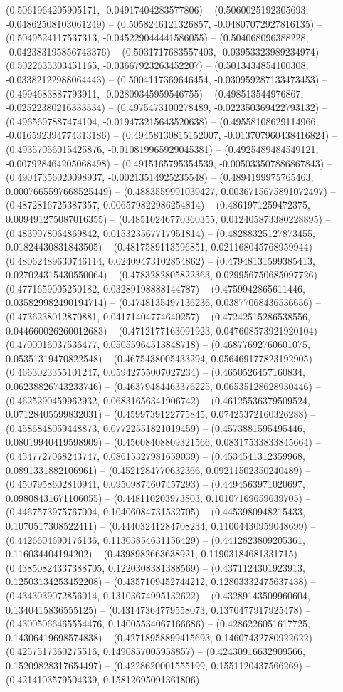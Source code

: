 (0.5061964205905171, -0.04917404283577806) -- (0.5060025192305693, -0.04862508103061249) -- (0.5058246121326857, -0.04807072927816135) -- (0.5049524117537313, -0.045229044441586055) -- (0.504068096388228, -0.042383195856743376) -- (0.5031717683557403, -0.03953323989234974) -- (0.5022635303451165, -0.03667923263452207) -- (0.5013434854100308, -0.03382122988064443) -- (0.5004117369646454, -0.030959287133473453) -- (0.4994683887793911, -0.02809345959546755) -- (0.498513544976867, -0.02522380216333534) -- (0.4975473100278489, -0.022350369422793132) -- (0.4965697887474104, -0.019473215643520638) -- (0.49558108629114966, -0.016592394774313186) -- (0.49458130815152007, -0.013707960438416824) -- (0.49357056015425876, -0.010819965929045381) -- (0.4925489484549121, -0.007928464205068498) -- (0.4915165795354539, -0.005033507886867843) -- (0.49047356020098937, -0.00213514925235548) -- (0.4894199975765463, 0.0007665597668525449) -- (0.4883559991039427, 0.0036715675891072497) -- (0.4872816725387357, 0.006579822986254814) -- (0.4861971259472375, 0.009491275087016355) -- (0.48510246770360355, 0.012405873380228895) -- (0.4839978064869842, 0.015323567717951814) -- (0.48288325127873455, 0.01824430831843505) -- (0.4817589113596851, 0.021168045768959944) -- (0.48062489630746114, 0.02409473102854862) -- (0.47948131599385413, 0.027024315430550064) -- (0.4783282805822363, 0.029956750685097726) -- (0.4771659005250182, 0.03289198888144787) -- (0.4759942865611446, 0.035829982490194714) -- (0.4748135497136236, 0.03877068436536656) -- (0.4736238012870881, 0.04171404774640257) -- (0.47242515286538556, 0.044660026260012683) -- (0.4712177163091923, 0.047608573921920104) -- (0.4700016037536477, 0.05055964513848718) -- (0.46877692760601075, 0.05351319470822548) -- (0.4675438005433294, 0.056469177823192905) -- (0.4663023355101247, 0.05942755007027234) -- (0.4650526457160834, 0.06238826743233746) -- (0.46379484463376225, 0.06535128628930446) -- (0.4625290459962932, 0.06831656341906742) -- (0.46125536379509524, 0.07128405599832031) -- (0.4599739122775845, 0.07425372160326288) -- (0.4586848059448873, 0.07722551821019459) -- (0.4573881595495446, 0.08019940419598909) -- (0.45608408809321566, 0.08317533833845664) -- (0.4547727068243747, 0.08615327981659039) -- (0.4534541312359968, 0.0891331882106961) -- (0.4521284770632366, 0.09211502350240489) -- (0.4507958602810941, 0.09509874607457293) -- (0.4494563971020697, 0.09808431671106055) -- (0.448110203973803, 0.10107169659639705) -- (0.4467573975767004, 0.10406084731532705) -- (0.4453980948215433, 0.1070517308522411) -- (0.44403241284708234, 0.11004430959048699) -- (0.4426604690176136, 0.11303854631156429) -- (0.4412823809205361, 0.116034404194202) -- (0.4398982663638921, 0.11903184681331715) -- (0.43850824337388705, 0.1220308381388569) -- (0.4371124301923913, 0.12503134253452208) -- (0.4357109452744212, 0.12803332475637438) -- (0.4343039072856014, 0.13103674995132622) -- (0.43289143509960604, 0.1340415836555125) -- (0.43147364779558073, 0.1370477917925478) -- (0.43005066465554476, 0.14005534067166686) -- (0.4286226051617725, 0.14306419698574838) -- (0.42718958899415693, 0.14607432780922622) -- (0.4257517360275516, 0.1490857005958857) -- (0.42430916632909566, 0.15209828317654497) -- (0.4228620001555199, 0.1551120437566269) -- (0.4214103579504339, 0.15812695091361806) 